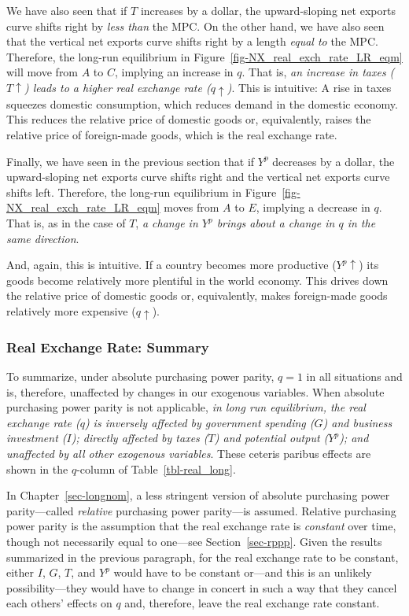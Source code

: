 \documentclass[
  letterpaper,
]{book}
\theoremstyle{plain}
\theoremstyle{remark}
\begin{document}
We have also seen that if \(T\) increases by a dollar, the
upward-sloping net exports curve shifts right by \emph{less than} the
MPC. On the other hand, we have also seen that the vertical net exports
curve shifts right by a length \emph{equal to} the MPC. Therefore, the
long-run equilibrium in Figure~\ref{fig-NX_real_exch_rate_LR_eqm} will
move from \(A\) to \(C\), implying an increase in \(q\). That is,
\emph{an increase in taxes (\(T\uparrow\)) leads to a higher real
exchange rate (\(q\uparrow\))}. This is intuitive: A rise in taxes
squeezes domestic consumption, which reduces demand in the domestic
economy. This reduces the relative price of domestic goods or,
equivalently, raises the relative price of foreign-made goods, which is
the real exchange rate.

Finally, we have seen in the previous section that if \(Y^p\) decreases
by a dollar, the upward-sloping net exports curve shifts right and the
vertical net exports curve shifts left. Therefore, the long-run
equilibrium in Figure~\ref{fig-NX_real_exch_rate_LR_eqm} moves from
\(A\) to \(E\), implying a decrease in \(q\). That is, as in the case of
\(T\), \emph{a change in \(Y^p\) brings about a change in \(q\) in the
same direction}.

And, again, this is intuitive. If a country becomes more productive
(\(Y^p\uparrow\)) its goods become relatively more plentiful in the
world economy. This drives down the relative price of domestic goods or,
equivalently, makes foreign-made goods relatively more expensive
(\(q\uparrow\)).

\subsubsection{Real Exchange Rate:
Summary}\label{sec-real-ex-rates-summary}

To summarize, under absolute purchasing power parity, \(q=1\) in all
situations and is, therefore, unaffected by changes in our exogenous
variables. When absolute purchasing power parity is not applicable,
\emph{in long run equilibrium, the real exchange rate (\(q\)) is
inversely affected by government spending (\(G\)) and business
investment (\(I\)); directly affected by taxes (\(T\)) and potential
output (\(Y^p\)); and unaffected by all other exogenous variables}.
These ceteris paribus effects are shown in the \(q\)-column of
Table~\ref{tbl-real_long}.

In Chapter~\ref{sec-longnom}, a less stringent version of absolute
purchasing power parity---called \emph{relative} purchasing power
parity---is assumed. Relative
purchasing power parity is the assumption that the real exchange rate is
\emph{constant} over time, though not necessarily equal to one---see
Section~\ref{sec-rppp}. Given the results summarized in the previous
paragraph, for the real exchange rate to be constant, either \(I\),
\(G\), \(T\), and \(Y^p\) would have to be constant or---and this is an
unlikely possibility---they would have to change in concert in such a
way that they cancel each others' effects on \(q\) and, therefore, leave
the real exchange rate constant.
\end{document}

